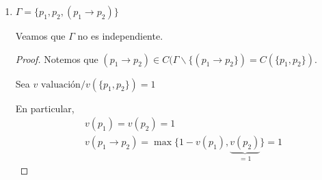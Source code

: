 \begin{enumerate}
\begin{proof}
\begin{enumerate}
                    Sea $g: \mathrm{VAR}\to \{ 0,1 \} / f(p_i) = \begin{cases}
                        1 & \text{si } i = 1 \\
                        0 & \text{si } i \neq 1
                    \end{cases}$

                    Sea $v_g$ la única valuación que extiende a $g$.

                    \begin{align*}
                        \implies& v_g(p_1)=g(p_1)=1 \\
                        & v_g(p_1 \to p_2)= \max 
                        \{\underbrace{1-\underbrace{v_g(p_1)}_{=1}}_{=0}, 
                        \underbrace{v_g(p_2)}_{=0}\} = 0
                    \end{align*}

                    Es decir,
                    $v_g(\Gamma \backslash \{ \alpha \}) = 1$ y
                    $v_g(\alpha) = 0$

                    \begin{gather*}
                        \implies \alpha \notin 
                        C(\Gamma \backslash \{ \alpha \})
                    \end{gather*}
        \end{enumerate}

        \begin{gather*}
            \therefore ~ \Gamma \text{ es independiente.}
        \end{gather*}

        \end{proof}

    \item $\Gamma = \{ p_1, p_2, (p_1 \to p_2)\}$

        Veamos que $\Gamma$ no es independiente.

        \begin{proof} \phantom{.}
                
            Notemos que 
            $(p_1 \to p_2) \in C(\Gamma \backslash \{ (p_1\to p_2 \}) 
            = C(\{ p_1, p_2 \})$.

            \medskip

            Sea $v \text{ valuación}/v(\{ p_1,p_2 \})=1$

            En particular,
            \begin{align*}
                & v(p_1) = v(p_2) = 1 \\
                & v(p_1\to p_2) = \max \{1-v(p_1), 
                \underbrace{v(p_2)}_{=1}\} = 1
            \end{align*}


\end{proof}
\end{enumerate}
